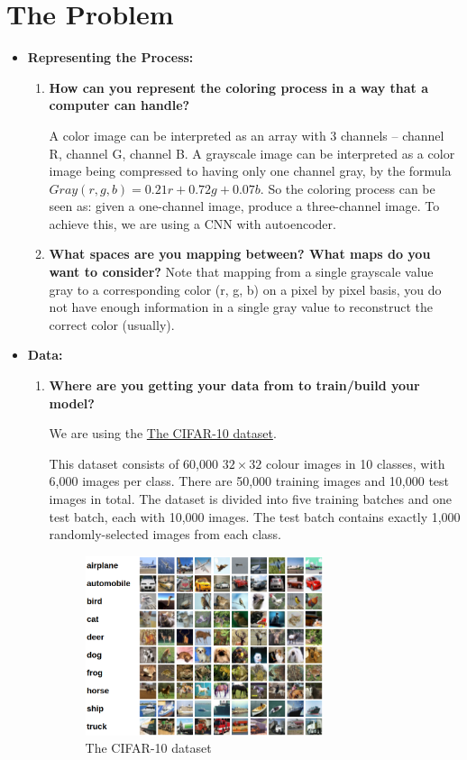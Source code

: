 \documentclass[letter]{article}
\begin{document}
\section{The Problem}
\label{sec:The Problem}
\begin{itemize}
	\item {\textbf{Representing the Process:}   } 
	\begin{enumerate}
		\item {\textbf{How can you represent the coloring process in a way that a computer can handle?}}
		\par{A color image can be interpreted as an array with 3 channels -- channel R,  channel G, channel B. A grayscale image can be interpreted as a color image being compressed to having only one channel gray, by the formula $ Gray(r, g, b) = 0.21r + 0.72g + 0.07b $. So the coloring process can be seen as: given a one-channel image, produce a three-channel image. To achieve this, we are using a CNN with autoencoder.}
		\item {\textbf{What spaces are you mapping between? What maps do you want to consider?} Note that mapping
			from a single grayscale value gray to a corresponding color (r, g, b) on a pixel by pixel basis, you do not have
			enough information in a single gray value to reconstruct the correct color (usually).}
	\end{enumerate}
	\item {\textbf{Data:}} 
	\begin{enumerate}
		\item {\textbf{Where are you getting your data from to train/build your model?}}
		\par{We are using the \href{http://www.cs.toronto.edu/~kriz/cifar.html}{The CIFAR-10 dataset}.}
		\par{This dataset consists of 60,000 $ 32\times32 $ colour images in 10 classes, with 6,000 images per class. There are 50,000 training images and 10,000 test images in total. The dataset is divided into five training batches and one test batch, each with 10,000 images. The test batch contains exactly 1,000 randomly-selected images from each class. }
		\begin{figure}[H]
			\centering
			\includegraphics[width=0.7\textwidth]{figs/fig-2.png}
			\caption{The CIFAR-10 dataset}
		\end{figure}
	

\end{enumerate}
\end{itemize}
\end{document}
